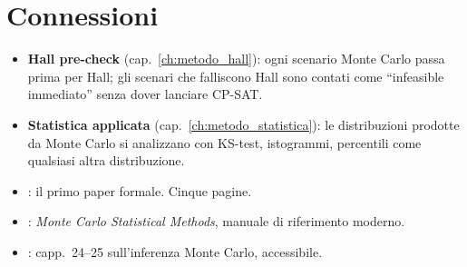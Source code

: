 \section{Connessioni}

\begin{connessionebox}
\begin{itemize}
\item \textbf{Hall pre-check} (cap.~\ref{ch:metodo_hall}):
  ogni scenario Monte Carlo passa prima per Hall; gli
  scenari che falliscono Hall sono contati come
  ``infeasible immediato'' senza dover lanciare CP-SAT.
\item \textbf{Statistica applicata}
  (cap.~\ref{ch:metodo_statistica}): le distribuzioni
  prodotte da Monte Carlo si analizzano con KS-test,
  istogrammi, percentili come qualsiasi altra
  distribuzione.
\end{itemize}
\end{connessionebox}

\begin{biblioparvabox}
\begin{itemize}
\item \cite{metropolis1949}: il primo paper formale.
  Cinque pagine.
\item \cite{robert2004}: \emph{Monte Carlo Statistical
  Methods}, manuale di riferimento moderno.
\item \cite{wasserman2004}: capp.~24--25 sull'inferenza
  Monte Carlo, accessibile.
\end{itemize}
\end{biblioparvabox}
